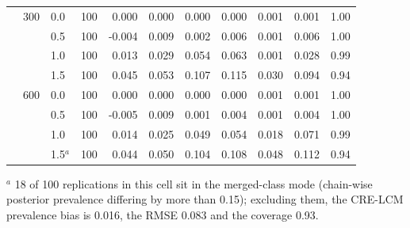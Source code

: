 \begin{table}[htbp]
\begin{tabular}{lllrrrrrrrr}
 & 300 & 0.0 & 100 & 0.000 & 0.000 & 0.000 & 0.000 & 0.001 & 0.001 & 1.00 \\
 &  & 0.5 & 100 & -0.004 & 0.009 & 0.002 & 0.006 & 0.001 & 0.006 & 1.00 \\
 &  & 1.0 & 100 & 0.013 & 0.029 & 0.054 & 0.063 & 0.001 & 0.028 & 0.99 \\
 &  & 1.5 & 100 & 0.045 & 0.053 & 0.107 & 0.115 & 0.030 & 0.094 & 0.94 \\
 & 600 & 0.0 & 100 & 0.000 & 0.000 & 0.000 & 0.000 & 0.001 & 0.001 & 1.00 \\
 &  & 0.5 & 100 & -0.005 & 0.009 & 0.001 & 0.004 & 0.001 & 0.004 & 1.00 \\
 &  & 1.0 & 100 & 0.014 & 0.025 & 0.049 & 0.054 & 0.018 & 0.071 & 0.99 \\
 &  & 1.5$^{a}$ & 100 & 0.044 & 0.050 & 0.104 & 0.108 & 0.048 & 0.112 & 0.94 \\
\bottomrule
\end{tabular}
\begin{flushleft}\footnotesize
$^{a}$ 18 of 100 replications in this cell sit in the merged-class mode (chain-wise posterior prevalence differing by more than 0.15); excluding them, the CRE-LCM prevalence bias is 0.016, the RMSE 0.083 and the coverage 0.93.
\end{flushleft}
\end{table}
